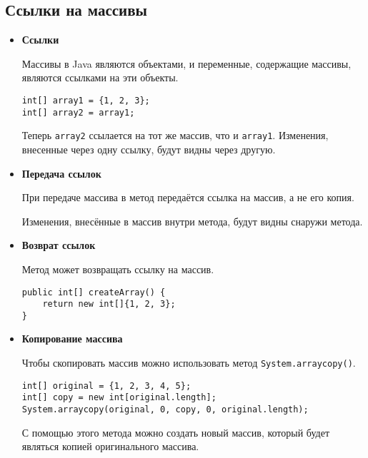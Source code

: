 \subsection{Ссылки на массивы}
\begin{itemize}
    \item \textbf{Ссылки}\par
    Массивы в Java являются объектами, и переменные, содержащие массивы, являются ссылками на эти объекты.
    \begin{verbatim}
int[] array1 = {1, 2, 3};
int[] array2 = array1;
    \end{verbatim}
    Теперь \texttt{array2} ссылается на тот же массив, что и \texttt{array1}.\newline
    Изменения, внесенные через одну ссылку, будут видны через другую.
    
    \item \textbf{Передача ссылок}\par
    При передаче массива в метод передаётся ссылка на массив, а не его копия.\par
    Изменения, внесённые в массив внутри метода, будут видны снаружи метода.

    \item \textbf{Возврат ссылок}\par
    Метод может возвращать ссылку на массив.
    \begin{verbatim}
public int[] createArray() {
    return new int[]{1, 2, 3};
}
    \end{verbatim}

    \item \textbf{Копирование массива}\par
    Чтобы скопировать массив можно использовать метод \texttt{System.arraycopy()}.
    \begin{verbatim}
int[] original = {1, 2, 3, 4, 5};
int[] copy = new int[original.length];
System.arraycopy(original, 0, copy, 0, original.length);
    \end{verbatim}
    С помощью этого метода можно создать новый массив, который будет являться копией оригинального массива.
\end{itemize}

